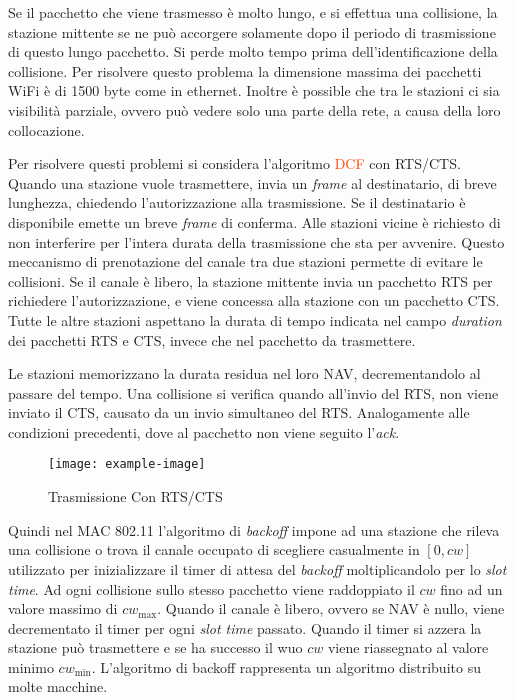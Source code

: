 \documentclass{article}
\numberwithin{equation}{subsection}
\begin{document}
Se il pacchetto che viene trasmesso è molto lungo, e si effettua una collisione, la stazione mittente se ne può accorgere solamente dopo il periodo di trasmissione di 
questo lungo pacchetto. Si perde molto tempo prima dell'identificazione della collisione. 
Per risolvere questo problema la dimensione massima dei pacchetti \textcolor{Sepia}{WiFi} è di 1500 byte come in ethernet. 
Inoltre è possible che tra le stazioni ci sia visibilità parziale, ovvero può vedere solo una parte della rete, a causa della loro collocazione. 

Per risolvere questi problemi si considera l'algoritmo \textcolor{OrangeRed}{DCF} con \textcolor{Dandelion}{RTS}/\textcolor{Dandelion}{CTS}. 
Quando una stazione vuole trasmettere, invia un \textit{frame} al destinatario, di breve lunghezza, chiedendo l'autorizzazione alla trasmissione. Se il destinatario è disponibile 
emette un breve \textit{frame} di conferma. Alle stazioni vicine è richiesto di non interferire per l'intera durata della trasmissione che sta per avvenire. Questo 
meccanismo di prenotazione del canale tra due stazioni permette di evitare le collisioni. 
Se il canale è libero, la stazione mittente invia un pacchetto \textcolor{Dandelion}{RTS} per richiedere l'autorizzazione, e viene concessa alla stazione con un pacchetto \textcolor{Dandelion}{CTS}. Tutte le altre 
stazioni aspettano la durata di tempo indicata nel campo \textit{duration} dei pacchetti \textcolor{Dandelion}{RTS} e \textcolor{Dandelion}{CTS}, invece che nel pacchetto da trasmettere. 

Le stazioni memorizzano la durata residua nel loro NAV, decrementandolo al passare del tempo. 
Una collisione si verifica quando all'invio del \textcolor{Dandelion}{RTS}, non viene inviato il \textcolor{Dandelion}{CTS}, causato da un invio simultaneo del \textcolor{Dandelion}{RTS}. Analogamente alle condizioni precedenti, dove al pacchetto non viene seguito l'\textit{ack}.

\begin{figure}[H]%
    \centering%
    \texttt{[image: example-image]}%
    \caption{Trasmissione Con \textcolor{Dandelion}{RTS}/\textcolor{Dandelion}{CTS}}%
\end{figure}

Quindi nel MAC 802.11 l'algoritmo di \textit{backoff} impone ad una stazione che rileva una collisione o trova il canale occupato di scegliere casualmente in $[0,cw]$ utilizzato per inizializzare il timer di attesa del \textit{backoff} moltiplicandolo per lo \textit{slot time}. Ad ogni collisione sullo stesso pacchetto viene raddoppiato il $cw$ fino ad un valore massimo di $cw_{\max}$. Quando il canale è libero, ovvero se NAV è nullo, viene decrementato il timer per ogni \textit{slot time} passato. Quando il timer si azzera la stazione può trasmettere e se ha successo il wuo $cw$ viene riassegnato al valore minimo $cw_{\min}$. 
L'algoritmo di backoff rappresenta un algoritmo distribuito su molte macchine. 
\end{document}

